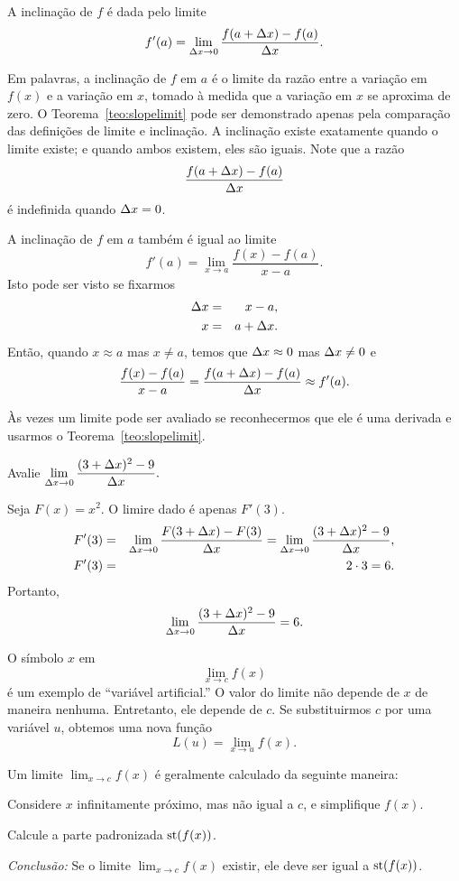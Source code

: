 \begin{theorem}\label{teo:slopelimit} A inclinação de $f$ é dada pelo limite
$$
  f'(a) = \lim_{\Delta x \to 0} \frac{f(a+\Delta x) - f(a)}{\Delta x}.
$$
\end{theorem}

Em palavras, a inclinação de $f$ em $a$ é o limite da razão entre a
variação em $f(x)$ e a variação em $x$, tomado à medida que a variação
em $x$ se aproxima de zero. O Teorema~\ref{teo:slopelimit} pode ser
demonstrado apenas pela comparação das definições de limite e inclinação.
A inclinação existe exatamente quando o limite existe; e quando ambos
existem, eles são iguais. Note que a razão
$$
  \frac{f(a+\Delta x) - f(a)}{\Delta x}
$$
é indefinida quando $\Delta x = 0$.

A inclinação de $f$ em $a$ também é igual ao limite
$$
  f'(a) = \lim_{x \to a} \frac{f(x) - f(a)}{x - a}.
$$
Isto pode ser visto se fixarmos
\begin{eqnarray*}
  \Delta x & = & x - a, \\
  x & = & a + \Delta x.
\end{eqnarray*}
Então, quando $x \approx a$ mas $x \ne a$, temos que $\Delta x \approx 0$ mas
$\Delta x \ne 0$ e
$$
  \frac{f(x) - f(a)}{x - a} = \frac{f(a + \Delta x) - f(a)}{\Delta x} \approx f'(a).
$$

Às vezes um limite pode ser avaliado se reconhecermos que ele é uma
derivada e usarmos o Teorema~\ref{teo:slopelimit}.

\begin{example}\label{ex:cap3p3ex1}
  Avalie $\displaystyle \lim_{\Delta x \to 0} \frac{(3 + \Delta x)^2 - 9}{\Delta x}.$

  Seja $F(x) = x^2$. O limire dado é apenas $F'(3)$.
  \begin{eqnarray*}
    F'(3) & = & \lim_{\Delta x \to 0} \frac{F(3 + \Delta x) - F(3)}{\Delta x} =
      \lim_{\Delta x \to 0} \frac{(3 + \Delta x)^2 - 9}{\Delta x}, \\
    F'(3) & = & 2 \cdot 3 = 6.
  \end{eqnarray*}
  Portanto,
  $$
    \lim_{\Delta x \to 0} \frac{(3 + \Delta x)^2 - 9}{\Delta x} = 6.
  $$
\end{example}

O símbolo $x$ em
$$
  \lim_{x \to c} f(x)
$$
é um exemplo de ``variável artificial.''
O valor do limite não depende de $x$ de maneira nenhuma. Entretanto, ele
depende de $c$. Se substituirmos $c$ por uma variável $u$, obtemos uma
nova função
$$
  L(u) = \lim_{x \to u} f(x).
$$

Um limite $\displaystyle \lim_{x \to c} f(x)$ é geralmente calculado da
seguinte maneira:
\begin{stepanalysis}
  \item Considere $x$ infinitamente próximo, mas não igual a $c$, e
        simplifique $f(x)$.
  \item Calcule a parte padronizada $\operatorname{st}(f(x))$.
\end{stepanalysis}
\emph{Conclusão:} Se o limite $\displaystyle \lim_{x \to c} f(x)$ existir,
ele deve ser igual a $\operatorname{st}(f(x))$.

